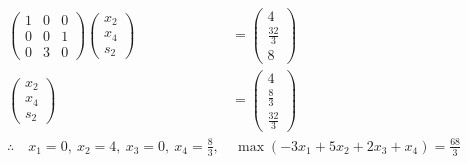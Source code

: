 \documentclass[a4paper,12pt]{article}
\begin{document}
\begin{align*}
    \begin{pmatrix}1 & 0 & 0 \\ 0 & 0 & 1 \\ 0 & 3 & 0\end{pmatrix} \begin{pmatrix}x_2 \\ x_4 \\ s_2\end{pmatrix} & = \begin{pmatrix}4 \\ \frac{32}{3} \\ 8\end{pmatrix}           \\
    \begin{pmatrix}x_2 \\ x_4 \\ s_2\end{pmatrix}                                                                 & = \begin{pmatrix}4 \\ \frac{8}{3} \\ \frac{32}{3}\end{pmatrix} \\
    \therefore \quad x_1 = 0, \ x_2 = 4, \ x_3 = 0, \ x_4 = \frac{8}{3},                                          & \ \max{(-3 x_1 + 5 x_2 + 2 x_3 + x_4)} = \frac{68}{3}          \\
\end{align*}
\end{document}
